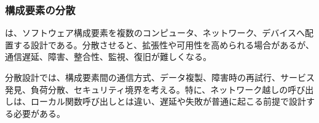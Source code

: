 \subsubsection{構成要素の分散}

 は、ソフトウェア構成要素を複数のコンピュータ、ネットワーク、デバイスへ配置する設計である。分散させると、拡張性や可用性を高められる場合があるが、通信遅延、障害、整合性、監視、復旧が難しくなる。

分散設計では、構成要素間の通信方式、データ複製、障害時の再試行、サービス発見、負荷分散、セキュリティ境界を考える。特に、ネットワーク越しの呼び出しは、ローカル関数呼び出しとは違い、遅延や失敗が普通に起こる前提で設計する必要がある。
